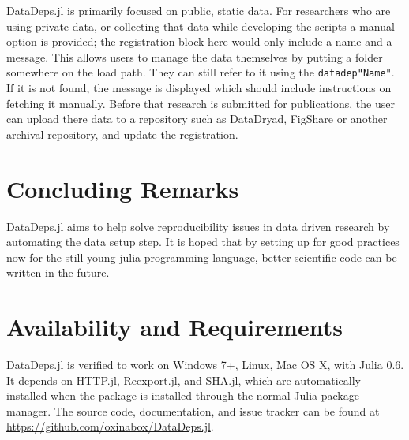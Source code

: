 \documentclass[twoside,11pt]{article}
\newcommand{\datadep}[1]{\texttt{datadep"{}#1"{}}}
\begin{document}
DataDeps.jl is primarily focused on public, static data.
For researchers who are using private data, or collecting that data while developing the scripts a manual option is provided; the registration block here would only include a name and a message. This allows users to manage the data themselves by putting a folder somewhere on the load path. They can still refer to it using the \datadep{Name}. If it is not found, the message is displayed which should include instructions on fetching it manually.
Before that research is submitted for publications, the user can upload there data to a repository such as DataDryad, FigShare or another archival repository, and update the registration.

\section {Concluding Remarks}
DataDeps.jl aims to help solve reproducibility issues in data driven research by automating the data setup step.
It is hoped that by setting up for good practices now for the still young julia programming language, better scientific code can be written in the future.



\section{Availability and Requirements}
DataDeps.jl is verified to work on  Windows 7+, Linux, Mac OS X, with Julia 0.6.
It depends on HTTP.jl, Reexport.jl, and SHA.jl, which are automatically installed when the package is installed through the normal Julia package manager.
The source code, documentation, and issue tracker can be found at \url{https://github.com/oxinabox/DataDeps.jl}.

\vskip 0.2in

\end{document}
